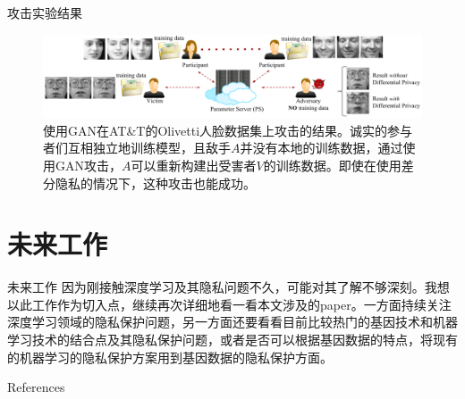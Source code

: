\documentclass[aspectratio=169]{beamer}
\begin{document}
\begin{frame}{攻击}{实验结果}
\begin{figure}[!ht]
\includegraphics[width = \linewidth]{fig/41_participants.pdf}
\caption{使用GAN在AT\&T的Olivetti人脸数据集上攻击的结果。诚实的参与者们互相独立地训练模型，且敌手$A$并没有本地的训练数据，通过使用GAN攻击，$A$可以重新构建出受害者$V$的训练数据。即使在使用差分隐私的情况下，这种攻击也能成功。}
\label{fig:41_participants}
\end{figure}
\end{frame}

\section{未来工作}
\begin{frame}{未来工作}
因为刚接触深度学习及其隐私问题不久，可能对其了解不够深刻。我想以此工作作为切入点，继续再次详细地看一看本文涉及的paper。一方面持续关注深度学习领域的隐私保护问题，另一方面还要看看目前比较热门的基因技术和机器学习技术的结合点及其隐私保护问题，或者是否可以根据基因数据的特点，将现有的机器学习的隐私保护方案用到基因数据的隐私保护方面。
\end{frame}


\begin{frame}{References}
\printbibliography
\end{frame}
\end{document}
